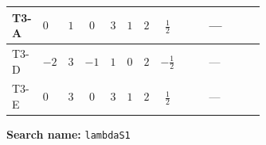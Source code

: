 \documentclass[8pt]{article}
\begin{document}
\begin{landscape}
\begin{longtable}{@{}llcccccc >{\raggedright\arraybackslash}p{0.21\linewidth} >{\raggedright\arraybackslash}p{0.21\linewidth} >{\raggedright\arraybackslash}p{0.21\linewidth}@{}}
\midrule
T3-A & $0$ & $1$ & $0$ & $3$ & $1$ & $2$ & $\frac{1}{2}$ & \scriptsize\adjustbox{max width=\linewidth}{$\begin{gathered} +4 {\lambda_{H1}}^2\end{gathered}$} & --- & \scriptsize\adjustbox{max width=\linewidth}{$\begin{gathered} +10 {\lambda_{S_1}}^2\end{gathered}$} \\
\midrule
T3-D & $-2$ & $3$ & $-1$ & $1$ & $0$ & $2$ & $-\frac{1}{2}$ & \scriptsize\adjustbox{max width=\linewidth}{$\begin{gathered} +4 {\lambda_{H1}}^2\end{gathered}$} & --- & \scriptsize\adjustbox{max width=\linewidth}{$\begin{gathered} +14 {\lambda_{S_1}}^2\end{gathered}$} \\
\midrule
T3-E & $0$ & $3$ & $0$ & $3$ & $1$ & $2$ & $\frac{1}{2}$ & \scriptsize\adjustbox{max width=\linewidth}{$\begin{gathered} +4 {\lambda_{H1}}^2\end{gathered}$} & --- & \scriptsize\adjustbox{max width=\linewidth}{$\begin{gathered} +14 {\lambda_{S_1}}^2\end{gathered}$} \\
\midrule
\bottomrule
\end{longtable}
\clearpage
\noindent\textbf{Search name: }\texttt{lambdaS1}\par\smallskip

\end{landscape}
\end{document}
